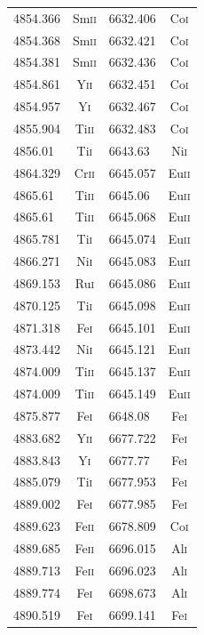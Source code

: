 \begin{longtable}[c]{|l|c|l|c|}
4854.366 & Sm\textsc{ii} & 6632.406 & Co\textsc{i}\\ 
4854.368 & Sm\textsc{ii} & 6632.421 & Co\textsc{i}\\ 
4854.381 & Sm\textsc{ii} & 6632.436 & Co\textsc{i}\\ 
4854.861 & Y\textsc{ii} & 6632.451 & Co\textsc{i}\\  
4854.957 & Y\textsc{i} & 6632.467 & Co\textsc{i}\\   
4855.904 & Ti\textsc{ii} & 6632.483 & Co\textsc{i}\\ 
4856.01 & Ti\textsc{i} & 6643.63 & Ni\textsc{i}\\    
4864.329 & Cr\textsc{ii} & 6645.057 & Eu\textsc{ii}\\
4865.61 & Ti\textsc{ii} & 6645.06 & Eu\textsc{ii}\\  
4865.61 & Ti\textsc{ii} & 6645.068 & Eu\textsc{ii}\\ 
4865.781 & Ti\textsc{i} & 6645.074 & Eu\textsc{ii}\\ 
4866.271 & Ni\textsc{i} & 6645.083 & Eu\textsc{ii}\\ 
4869.153 & Ru\textsc{i} & 6645.086 & Eu\textsc{ii}\\ 
4870.125 & Ti\textsc{i} & 6645.098 & Eu\textsc{ii}\\ 
4871.318 & Fe\textsc{i} & 6645.101 & Eu\textsc{ii}\\ 
4873.442 & Ni\textsc{i} & 6645.121 & Eu\textsc{ii}\\ 
4874.009 & Ti\textsc{ii} & 6645.137 & Eu\textsc{ii}\\
4874.009 & Ti\textsc{ii} & 6645.149 & Eu\textsc{ii}\\
4875.877 & Fe\textsc{i} & 6648.08 & Fe\textsc{i}\\   
4883.682 & Y\textsc{ii} & 6677.722 & Fe\textsc{i}\\  
4883.843 & Y\textsc{i} & 6677.77 & Fe\textsc{i}\\    
4885.079 & Ti\textsc{i} & 6677.953 & Fe\textsc{i}\\  
4889.002 & Fe\textsc{i} & 6677.985 & Fe\textsc{i}\\  
4889.623 & Fe\textsc{ii} & 6678.809 & Co\textsc{i}\\ 
4889.685 & Fe\textsc{ii} & 6696.015 & Al\textsc{i}\\ 
4889.713 & Fe\textsc{ii} & 6696.023 & Al\textsc{i}\\ 
4889.774 & Fe\textsc{i} & 6698.673 & Al\textsc{i}\\  
4890.519 & Fe\textsc{i} & 6699.141 & Fe\textsc{i}\\  

\end{longtable}
